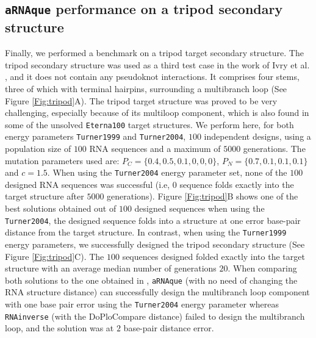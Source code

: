 \subsection{\texttt{aRNAque} performance on a tripod secondary structure}

Finally, we performed a benchmark on a tripod target secondary structure. The tripod secondary structure was used as a third test case in the work of Ivry et al. \cite{ivry2009image}, and it does not contain any pseudoknot interactions. It comprises four stems, three of which with terminal hairpins, surrounding a multibranch loop (See Figure \ref{Fig:tripod}A). The tripod target structure was proved to be very challenging, especially because of its multiloop component, which is also found in some of the unsolved \texttt{Eterna100} target structures. We perform here, for both energy parameters \texttt{Turner1999} and  \texttt{Turner2004}, $100$ independent designs, using a population size of $100$ RNA sequences and a maximum of $5000$ generations. The mutation parameters used are: $P_C=\{0.4,0.5,0.1,0,0,0\}$, $P_N=\{0.7,0.1,0.1,0.1\}$ and $c=1.5$. When using the \texttt{Turner2004} energy parameter set, none of the $100$ designed RNA sequences was successful (i.e, $0$ sequence folds exactly into the target structure after $5000$ generations). Figure \ref{Fig:tripod}B shows one of the best solutions obtained out of $100$ designed sequences when using the \texttt{Turner2004}, the designed sequence folds into a structure at one error base-pair distance from the target structure. In contrast, when using the \texttt{Turner1999} energy parameters, we successfully designed the tripod secondary structure (See Figure \ref{Fig:tripod}C). The $100$ sequences designed folded exactly into the target structure with an average median number of generations $20$. When comparing both solutions to the one obtained in \cite{ivry2009image}, \texttt{aRNAque} (with no need of changing the RNA structure distance) can successfully design the multibranch loop component with one base pair error using the \texttt{Turner2004} energy parameter whereas \texttt{RNAinverse} (with the DoPloCompare distance) failed to design the multibranch loop, and the solution was at $2$ base-pair distance error.

